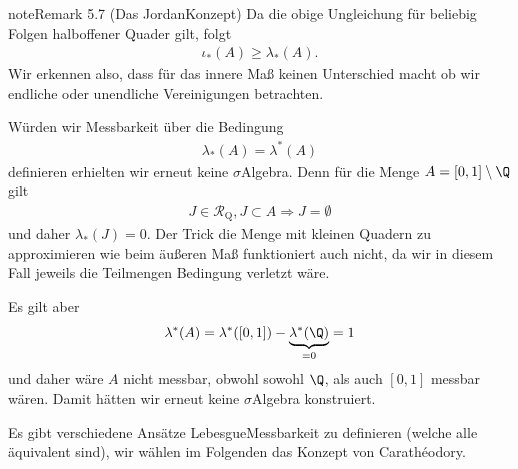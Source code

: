 \documentclass[letterpaper,10pt,german]{jupyterBook}
\begin{document}
\begin{sphinxadmonition}{note}{Remark 5.7 (Das Jordan\sphinxhyphen{}Konzept)}
\sphinxAtStartPar
Da die obige Ungleichung für beliebig Folgen halboffener Quader gilt, folgt
\begin{equation*}
\begin{split}\iota_\ast(A) \geq \lambda_\ast(A).\end{split}
\end{equation*}
\sphinxAtStartPar
Wir erkennen also, dass für das innere Maß keinen Unterschied macht ob wir endliche oder unendliche Vereinigungen betrachten.

\sphinxAtStartPar
Würden wir Messbarkeit über die Bedingung
\begin{equation*}
\begin{split}\lambda_\ast(A)=\lambda^\ast(A)\end{split}
\end{equation*}
\sphinxAtStartPar
definieren erhielten wir erneut keine \(\sigma\)\sphinxhyphen{}Algebra. Denn für die Menge \(A=[0,1]\setminus\Q\) gilt
\begin{equation*}
\begin{split}J\in\mathcal{R}_{\text{Q}}, J\subset A\Rightarrow J=\emptyset\end{split}
\end{equation*}
\sphinxAtStartPar
und daher \(\lambda_\ast(J) = 0\). Der Trick die Menge mit kleinen Quadern zu approximieren wie beim äußeren Maß funktioniert auch nicht, da wir in diesem Fall jeweils die Teilmengen Bedingung verletzt wäre.

\sphinxAtStartPar
Es gilt aber
\begin{equation*}
\begin{split}\lambda^\ast(A) = \lambda^\ast([0,1]) - \underbrace{\lambda^\ast(\Q)}_{=0} = 1\end{split}
\end{equation*}
\sphinxAtStartPar
und daher wäre \(A\) nicht messbar, obwohl sowohl \(\Q\), als auch \([0,1]\) messbar wären. Damit hätten wir erneut keine \(\sigma\)\sphinxhyphen{}Algebra konstruiert.
\end{sphinxadmonition}

\sphinxAtStartPar
Es gibt verschiedene Ansätze Lebesgue\sphinxhyphen{}Messbarkeit zu definieren (welche alle äquivalent sind), wir wählen im Folgenden das Konzept von
Carathéodory.
\end{document}
